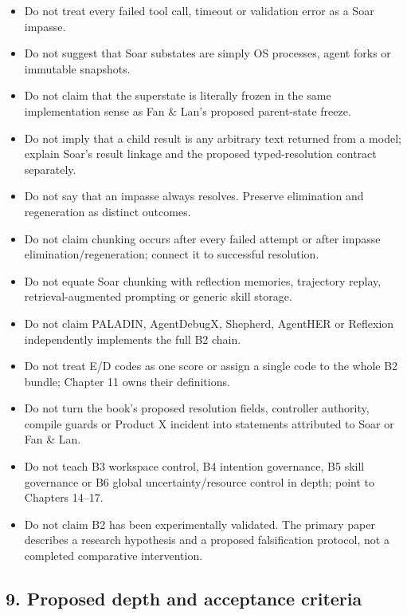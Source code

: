 \begin{itemize}
\tightlist
\item
  Do not treat every failed tool call, timeout or validation error as a Soar impasse.
\item
  Do not suggest that Soar substates are simply OS processes, agent forks or immutable snapshots.
\item
  Do not claim that the superstate is literally frozen in the same implementation sense as Fan \& Lan's proposed parent-state freeze.
\item
  Do not imply that a child result is any arbitrary text returned from a model; explain Soar's result linkage and the proposed typed-resolution contract separately.
\item
  Do not say that an impasse always resolves. Preserve elimination and regeneration as distinct outcomes.
\item
  Do not claim chunking occurs after every failed attempt or after impasse elimination/regeneration; connect it to successful resolution.
\item
  Do not equate Soar chunking with reflection memories, trajectory replay, retrieval-augmented prompting or generic skill storage.
\item
  Do not claim PALADIN, AgentDebugX, Shepherd, AgentHER or Reflexion independently implements the full B2 chain.
\item
  Do not treat E/D codes as one score or assign a single code to the whole B2 bundle; Chapter 11 owns their definitions.
\item
  Do not turn the book's proposed resolution fields, controller authority, compile guards or Product X incident into statements attributed to Soar or Fan \& Lan.
\item
  Do not teach B3 workspace control, B4 intention governance, B5 skill governance or B6 global uncertainty/resource control in depth; point to Chapters 14--17.
\item
  Do not claim B2 has been experimentally validated. The primary paper describes a research hypothesis and a proposed falsification protocol, not a completed comparative intervention.
\end{itemize}

\subsection{9. Proposed depth and acceptance criteria}\label{proposed-depth-and-acceptance-criteria}

